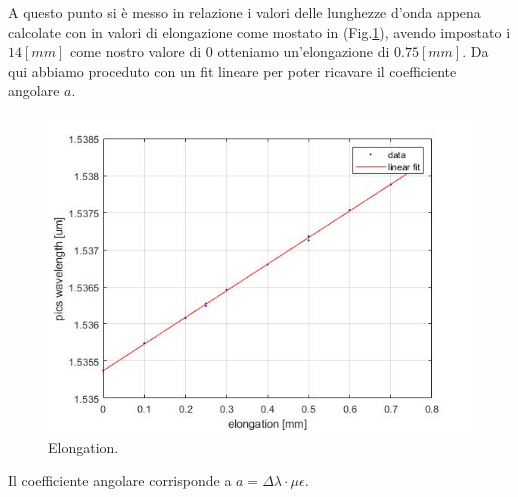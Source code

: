 A questo punto si è messo in relazione i valori delle lunghezze d'onda appena calcolate con in valori di elongazione come mostato in (Fig.\ref{fig:spins}), avendo impostato i $14[mm]$ come nostro valore di 0 otteniamo un'elongazione di $0.75[mm]$. Da qui abbiamo proceduto con un fit lineare per poter ricavare il coefficiente angolare $a$.
\begin{figure}[h]
    \centering
    \includegraphics[scale=0.7]{img/spins.jpg}
    \caption{Elongation.}
    \label{fig:spins}
\end{figure}
Il coefficiente angolare corrisponde a $a = \Delta \lambda \cdot \mu \epsilon$.


\newpage
{}

